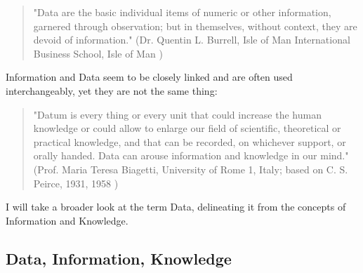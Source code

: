 \documentclass[a4paper,english,twoside,BCOR1.5cm,headsepline,DIV12,appendixprefix,final,12pt]{scrbook}
\begin{document}
\begin{quote}
"Data are the basic individual items of numeric or other information,
garnered through observation; but in themselves,
without context, they are devoid of information."
(Dr. Quentin L. Burrell, Isle of Man International Business School, Isle of Man \cite{Zins2007})
\end{quote}

Information and Data seem to be closely linked and are often used interchangeably, yet they are not the same thing:




\begin{quote}
"Datum is every thing or every unit that could increase the
human knowledge or could allow to enlarge our field of scientific,
theoretical or practical knowledge, and that can be
recorded, on whichever support, or orally handed. Data can
arouse information and knowledge in our mind." (Prof. Maria Teresa Biagetti, University of Rome 1, Italy; based on C. S. Peirce, 1931,
1958 \cite{Zins2007})
\end{quote}

I will take a broader look at the term Data, delineating it from the concepts of Information and Knowledge.

\subsection{Data, Information, Knowledge}
\label{sec:kids}
\end{document}
